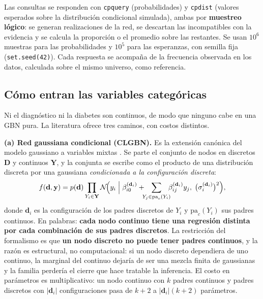 \documentclass[11pt, a4paper]{article}
\begin{document}
Las consultas se responden con \texttt{cpquery} (probabilidades) y \texttt{cpdist} (valores
esperados sobre la distribución condicional simulada), ambas por \textbf{muestreo lógico}: se
generan realizaciones de la red, se descartan las incompatibles con la evidencia y se calcula la
proporción o el promedio sobre las restantes. Se usan $10^6$ muestras para las probabilidades y
$10^5$ para las esperanzas, con semilla fija (\texttt{set.seed(42)}). Cada respuesta se acompaña
de la frecuencia observada en los datos, calculada sobre el mismo universo, como referencia.

\subsection{Cómo entran las variables categóricas}
\label{sec:met-categoricas}

Ni el diagnóstico ni la diabetes son continuos, de modo que ninguno cabe en una GBN pura. La
literatura ofrece tres caminos, con costos distintos.

\textbf{(a) Red gaussiana condicional (CLGBN).} Es la extensión canónica del modelo gaussiano a
variables mixtas \cite{lauritzen1989,lauritzen1992}. Se parte el conjunto de nodos en discretos
$\mathbf{D}$ y continuos $\mathbf{Y}$, y la conjunta se escribe como el producto de una
distribución discreta por una gaussiana \textit{condicionada a la configuración discreta}:
\begin{equation}
    f(\mathbf{d},\mathbf{y}) = p(\mathbf{d}) \prod_{Y_i \in \mathbf{Y}}
    \mathcal{N}\!\Bigl(y_i \;\Big|\; \beta_{i0}^{(\mathbf{d}_i)} +
    \!\!\!\sum_{Y_j \in \mathrm{pa}_c(Y_i)}\!\!\! \beta_{ij}^{(\mathbf{d}_i)} y_j,\;
    \bigl(\sigma_i^{(\mathbf{d}_i)}\bigr)^2\Bigr),
    \label{eq:clgbn}
\end{equation}
donde $\mathbf{d}_i$ es la configuración de los padres discretos de $Y_i$ y
$\mathrm{pa}_c(Y_i)$ sus padres continuos. En palabras: \textbf{cada nodo continuo tiene una
regresión distinta por cada combinación de sus padres discretos}. La restricción del formalismo es
que \textbf{un nodo discreto no puede tener padres continuos}, y la razón es estructural, no
computacional: si un nodo discreto dependiera de uno continuo, la marginal del continuo dejaría de
ser una mezcla finita de gaussianas y la familia perdería el cierre que hace tratable la
inferencia. El costo en parámetros es multiplicativo: un nodo continuo con $k$ padres continuos y
padres discretos con $|\mathbf{d}_i|$ configuraciones pasa de $k+2$ a $|\mathbf{d}_i|(k+2)$
parámetros.
\end{document}
